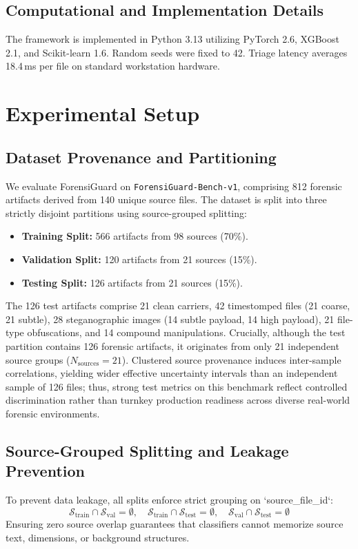 \documentclass[conference]{IEEEtran}
\begin{document}
\subsection{Computational and Implementation Details}
The framework is implemented in Python 3.13 utilizing PyTorch 2.6, XGBoost 2.1, and Scikit-learn 1.6. Random seeds were fixed to 42. Triage latency averages 18.4\,ms per file on standard workstation hardware.

\section{Experimental Setup}
\subsection{Dataset Provenance and Partitioning}
We evaluate ForensiGuard on \texttt{ForensiGuard-Bench-v1}, comprising 812 forensic artifacts derived from 140 unique source files. The dataset is split into three strictly disjoint partitions using source-grouped splitting:
\begin{itemize}
    \item \textbf{Training Split:} 566 artifacts from 98 sources (70\%).
    \item \textbf{Validation Split:} 120 artifacts from 21 sources (15\%).
    \item \textbf{Testing Split:} 126 artifacts from 21 sources (15\%).
\end{itemize}
The 126 test artifacts comprise 21 clean carriers, 42 timestomped files (21 coarse, 21 subtle), 28 steganographic images (14 subtle payload, 14 high payload), 21 file-type obfuscations, and 14 compound manipulations. Crucially, although the test partition contains 126 forensic artifacts, it originates from only 21 independent source groups ($N_{\text{sources}}=21$). Clustered source provenance induces inter-sample correlations, yielding wider effective uncertainty intervals than an independent sample of 126 files; thus, strong test metrics on this benchmark reflect controlled discrimination rather than turnkey production readiness across diverse real-world forensic environments.

\subsection{Source-Grouped Splitting and Leakage Prevention}
To prevent data leakage, all splits enforce strict grouping on `source\_file\_id`:
\begin{equation}
    \mathcal{S}_{\text{train}} \cap \mathcal{S}_{\text{val}} = \emptyset, \quad \mathcal{S}_{\text{train}} \cap \mathcal{S}_{\text{test}} = \emptyset, \quad \mathcal{S}_{\text{val}} \cap \mathcal{S}_{\text{test}} = \emptyset
\end{equation}
Ensuring zero source overlap guarantees that classifiers cannot memorize source text, dimensions, or background structures.
\end{document}
